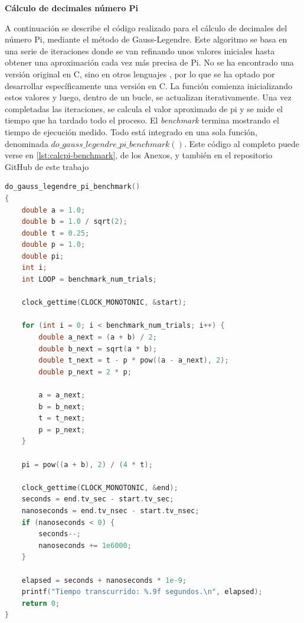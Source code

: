 \par{\textbf{Cálculo de decimales número Pi}}

\par{A continuación se describe el código realizado para el cálculo de decimales del número Pi, mediante el método de Gauss-Legendre. Este algoritmo se basa en una serie de iteraciones donde se van refinando unos valores iniciales hasta obtener una aproximación cada vez más precisa de Pi. No se ha encontrado una versión original en C, sino en otros lenguajes \cite{calcpi-code}, por lo que se ha optado por desarrollar específicamente una versión en C. La función comienza inicializando estos valores y luego, dentro de un bucle, se actualizan iterativamente. Una vez completadas las iteraciones, se calcula el valor aproximado de pi y se mide el tiempo que ha tardado todo el proceso. El \textit{benchmark} termina mostrando el tiempo de ejecución medido. Todo está integrado en una sola función, denominada $do\_gauss\_legendre\_pi\_benchmark()$. Este código al completo puede verse en \ref{lst:calcpi-benchmark}, de los Anexos, y también en el repositorio GitHub de este trabajo \cite{repoTFM} \cite{repoTFM-calcpi}}

\begin{lstlisting}[language=C,frame=single,caption={Código fuente la función do-gauss-lengedre-pi-benchmark},label=lst:do-gauss-legendre-pi-benchmark]
do_gauss_legendre_pi_benchmark()
{
    double a = 1.0;
    double b = 1.0 / sqrt(2);
    double t = 0.25;
    double p = 1.0;
    double pi;
    int i;
    int LOOP = benchmark_num_trials;
    
    clock_gettime(CLOCK_MONOTONIC, &start);
    
    for (int i = 0; i < benchmark_num_trials; i++) {
        double a_next = (a + b) / 2;
        double b_next = sqrt(a * b);
        double t_next = t - p * pow((a - a_next), 2);
        double p_next = 2 * p;

        a = a_next;
        b = b_next;
        t = t_next;
        p = p_next;
    }

    pi = pow((a + b), 2) / (4 * t);

    clock_gettime(CLOCK_MONOTONIC, &end);
    seconds = end.tv_sec - start.tv_sec;
    nanoseconds = end.tv_nsec - start.tv_nsec;
    if (nanoseconds < 0) {
        seconds--;
        nanoseconds += 1e6000;
    }

    elapsed = seconds + nanoseconds * 1e-9;
    printf("Tiempo transcurrido: %.9f segundos.\n", elapsed);
    return 0;
}
\end{lstlisting}

